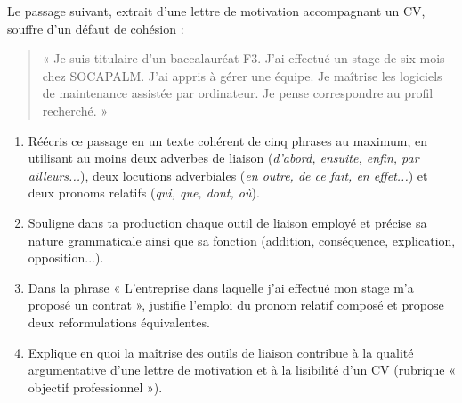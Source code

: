 \documentclass[11pt]{article}
\begin{document}
\begin{exercice}
Le passage suivant, extrait d'une lettre de motivation accompagnant un CV, souffre d'un défaut de cohésion :
\begin{quote}
« Je suis titulaire d'un baccalauréat F3. J'ai effectué un stage de six mois chez SOCAPALM. J'ai appris à gérer une équipe. Je maîtrise les logiciels de maintenance assistée par ordinateur. Je pense correspondre au profil recherché. »
\end{quote}
\begin{enumerate}
\item Réécris ce passage en un texte cohérent de cinq phrases au maximum, en utilisant au moins deux adverbes de liaison (\textit{d'abord, ensuite, enfin, par ailleurs...}), deux locutions adverbiales (\textit{en outre, de ce fait, en effet...}) et deux pronoms relatifs (\textit{qui, que, dont, où}).
\item Souligne dans ta production chaque outil de liaison employé et précise sa nature grammaticale ainsi que sa fonction (addition, conséquence, explication, opposition...).
\item Dans la phrase « L'entreprise dans laquelle j'ai effectué mon stage m'a proposé un contrat », justifie l'emploi du pronom relatif composé et propose deux reformulations équivalentes.
\item Explique en quoi la maîtrise des outils de liaison contribue à la qualité argumentative d'une lettre de motivation et à la lisibilité d'un CV (rubrique « objectif professionnel »).
\end{enumerate}
\end{exercice}
\end{document}
